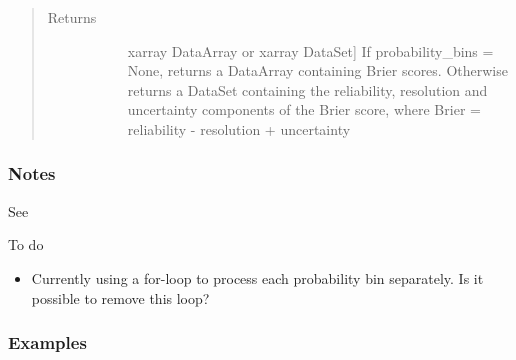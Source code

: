 \documentclass[letterpaper,10pt,english]{sphinxmanual}
\begin{document}
\begin{fulllineitems}
\begin{quote}
\begin{description}
\item[{Returns}] \leavevmode\begin{description}
\item[{}] \leavevmode{[}xarray DataArray or xarray DataSet{]}
If probability\_bins = None, returns a DataArray containing Brier scores. Otherwise returns                     a DataSet containing the reliability, resolution and uncertainty components of the Brier                     score, where Brier = reliability - resolution + uncertainty

\end{description}

\end{description}\end{quote}
\subsubsection*{Notes}

See 

To do
\begin{itemize}
\item {} 
Currently using a for-loop to process each probability bin separately. Is it possible                 to remove this loop?

\end{itemize}
\subsubsection*{Examples}


\end{fulllineitems}
\end{document}
